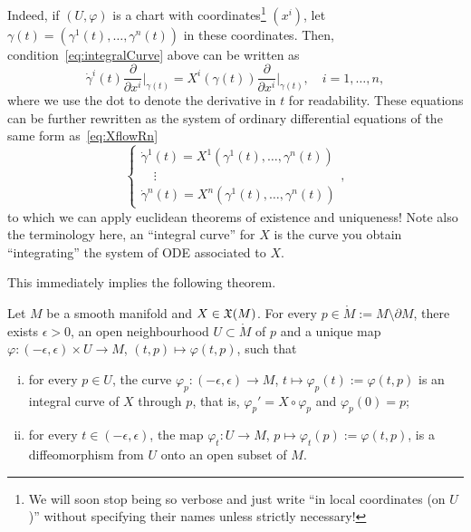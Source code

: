 Indeed, if $(U, \varphi)$ is a chart with coordinates\footnote{We will soon stop being so verbose and just write ``in local coordinates (on $U$)'' without specifying their names unless strictly necessary!} $(x^i)$, let $\gamma(t) = (\gamma^1(t), \ldots, \gamma^n(t))$ in these coordinates. Then, condition~\eqref{eq:integralCurve} above can be written as
\begin{equation}
  \dot\gamma^i(t)\frac{\partial}{\partial x^i}\Big|_{\gamma(t)}
  = X^i(\gamma(t))\frac{\partial}{\partial x^i}\Big|_{\gamma(t)},\quad i=1,\ldots,n,
\end{equation}
where we use the dot to denote the derivative in $t$ for readability.
These equations can be further rewritten as the system of ordinary differential equations of the same form as~\eqref{eq:XflowRn}
\begin{equation}
  \begin{cases}
    \dot\gamma^1(t) = X^1(\gamma^1(t), \ldots, \gamma^n(t)) \\
    \quad \vdots                                            \\
    \dot\gamma^n(t) = X^n(\gamma^1(t), \ldots, \gamma^n(t))
  \end{cases},
\end{equation}
to which we can apply euclidean theorems of existence and uniqueness!
Note also the terminology here, an ``integral curve'' for $X$ is the curve you obtain ``integrating'' the system of ODE associated to $X$.

This immediately implies the following theorem.

\begin{theorem} %
  \label{thm:exuniqloc}
  Let $M$ be a smooth manifold and $X\in\mathfrak{X}(M)$. For every $p\in \mathring M := M\setminus \partial M$, there exists $\epsilon > 0$, an open neighbourhood $U\subset\mathring M$ of $p$ and a unique map $\varphi : (-\epsilon, \epsilon) \times U \to M$, $(t, p) \mapsto \varphi(t,p)$, such that
  \begin{enumerate}[(i)]
    \item for every $p\in U$, the curve $\varphi_p : (-\epsilon, \epsilon) \to M$, $t\mapsto \varphi_p(t) := \varphi(t, p)$ is an integral curve of $X$ through $p$, that is, $\varphi_p' = X\circ\varphi_p$ and $\varphi_p(0) = p$;
    \item for every $t\in(-\epsilon, \epsilon)$, the map $\varphi_t: U \to M$, $p\mapsto \varphi_t(p):=\varphi(t,p)$, is a diffeomorphism from $U$ onto an open subset of $M$.
  \end{enumerate}
\end{theorem}

